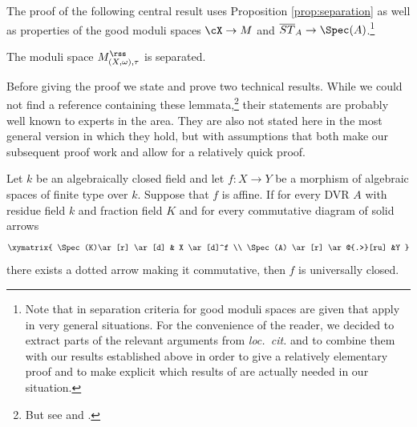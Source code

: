 The proof of the following central result uses Proposition \ref{prop:separation} as well as properties of the good moduli spaces $\cX\to M$ and $\overline{ST}_A\to \Spec (A)$.\footnote{Note that in \cite{AHLH} separation criteria for good moduli spaces are given that apply in very general situations. For the convenience of the reader, we decided to extract parts of the relevant arguments from \emph{loc.~cit.} and to combine them with our results established above in order to give a relatively elementary proof and to make explicit which results of \cite{AHLH} are actually needed in our situation.}

\begin{cor}[Separatedness]\label{cor:separation}
The moduli space $M_{(X,\omega),\tau}^{{\rss}}$
is separated.
\end{cor}

Before giving the proof we state and prove two technical results. While we could not find a reference containing these lemmata,\footnote{But see \cite[\S 7.2]{Kempf} and \cite{Ant}.} their statements are probably well known to experts in the area. They are also not stated here in the most general version in which they hold, but with assumptions that both make our subsequent proof work and allow for a relatively quick proof.

\begin{lemma}\label{rem:valuative criterion closedness}
Let $k$ be an algebraically closed field and let $f:X\to Y$ be a morphism of algebraic spaces of finite type over $k$. Suppose that $f$ is affine. If for every DVR $A$ with residue field $k$ and fraction field $K$ and for every commutative diagram of solid arrows
\begin{equation*}
\begin{gathered}
\xymatrix{
\Spec(K)\ar[r] \ar[d] & X \ar[d]^f \\
\Spec(A) \ar[r] \ar@{.>}[ru] &Y
}
\end{gathered}
\end{equation*}
there exists a dotted arrow making it commutative, then $f$ is universally closed.
\end{lemma}

